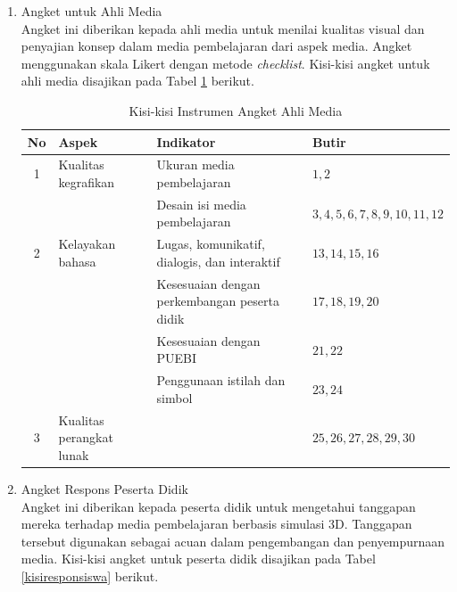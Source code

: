 \begin{enumerate}
\begin{enumerate}
\begin{enumerate}
\begin{table}[H]
\begin{tabular}{|c|p{2.5cm}|p{6cm}|p{3.5cm}|}
                \end{tabular}
            \end{table}
            \item Angket untuk Ahli Media\\
            \hspace*{1cm}Angket ini diberikan kepada ahli media untuk menilai kualitas visual dan penyajian konsep dalam media pembelajaran dari aspek media. Angket menggunakan skala Likert dengan metode \textit{checklist}. Kisi-kisi angket untuk ahli media disajikan pada Tabel \ref{kisiahlimedia} berikut.
            \begin{table}[H]
                \centering
                \caption{Kisi-kisi Instrumen Angket Ahli Media}
                \label{kisiahlimedia}
                \begin{tabular}{|c|p{3.5cm}|p{5.5cm}|p{4.5cm}|}
                    \hline
                    \textbf{No} & \textbf{Aspek} & \textbf{Indikator} & \textbf{Butir}\\
                    \hline
                    1 & Kualitas kegrafikan & Ukuran media pembelajaran & \(1,2\)\\
                    && Desain isi media pembelajaran & \(3,4,5,6,7,8,9,10,11,12\)\\
                    \hline
                    2 & Kelayakan bahasa & Lugas, komunikatif, dialogis, dan interaktif & \(13,14,15,16\)\\
                    && Kesesuaian dengan perkembangan peserta didik & \(17,18,19,20\)\\
                    && Kesesuaian dengan PUEBI & \(21,22\)\\
                    && Penggunaan istilah dan simbol & \(23,24\)\\
                    \hline
                    3 & Kualitas perangkat lunak & & \(25,26,27,28,29,30\)\\
                    \hline
                \end{tabular}
            \end{table}
            \item Angket Respons Peserta Didik\\
            \hspace*{1cm}Angket ini diberikan kepada peserta didik untuk mengetahui tanggapan mereka terhadap media pembelajaran berbasis simulasi 3D. Tanggapan tersebut digunakan sebagai acuan dalam pengembangan dan penyempurnaan media. Kisi-kisi angket untuk peserta didik disajikan pada Tabel \ref{kisiresponsiswa} berikut.

\end{enumerate}
\end{enumerate}
\end{enumerate}
